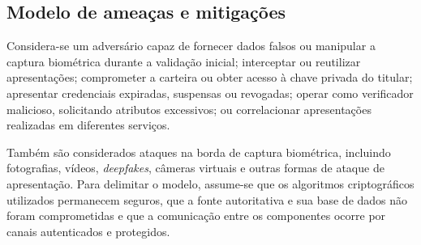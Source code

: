 \documentclass[12pt]{article}
\begin{document}
\subsection{Modelo de ameaças e mitigações}
\label{sec:modelo-ameacas}

Considera-se um adversário capaz de fornecer dados falsos ou manipular a captura biométrica durante a validação inicial; interceptar ou reutilizar apresentações; comprometer a carteira ou obter acesso à chave privada do titular; apresentar credenciais expiradas, suspensas ou revogadas; operar como verificador malicioso, solicitando atributos excessivos; ou correlacionar apresentações realizadas em diferentes serviços.

Também são considerados ataques na borda de captura biométrica, incluindo fotografias, vídeos, \textit{deepfakes}, câmeras virtuais e outras formas de ataque de apresentação. Para delimitar o modelo, assume-se que os algoritmos criptográficos utilizados permanecem seguros, que a fonte autoritativa e sua base de dados não foram comprometidas e que a comunicação entre os componentes ocorre por canais autenticados e protegidos.
\end{document}
